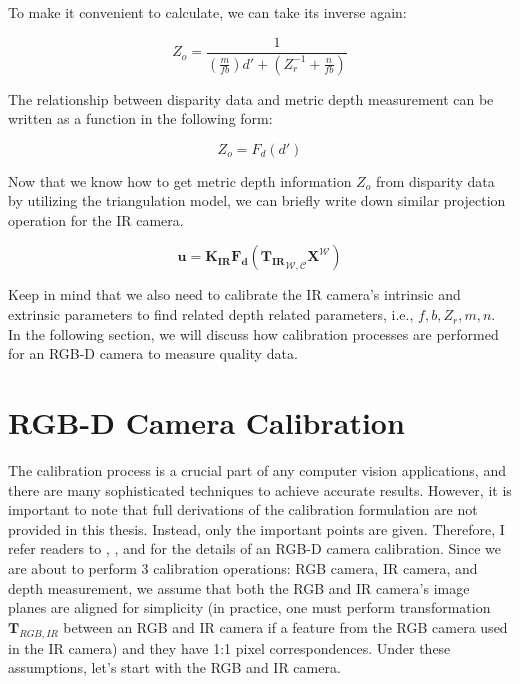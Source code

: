 \documentclass[12pt]{report}
\numberwithin{figure}{section}
\begin{document}
To make it convenient to calculate, we can take its inverse again:

\begin{equation}\label{eq:depth_w_disparity}
  Z_o = \frac{1}{(\frac{m}{fb})d' + (Z_r^{-1} + \frac{n}{fb})}
\end{equation}

The relationship between disparity data and metric depth measurement can be 
written as a function in the following form:

\begin{equation}\label{eq:ir_cam_proj_func}
  Z_o
  =
  F_d(d')
\end{equation} 


Now that we know how to get metric depth information $Z_o$ from 
disparity data 
by utilizing the triangulation model, we can briefly write down similar 
projection operation for the IR camera.

\begin{equation}\label{eq:ir_cam_proj_func}
  \mathbf{u} 
  =
  \mathbf{K_{IR}} \mathbf{F_d} ({\mathbf{T_{IR}}}_{\mathcal{W}, \mathcal{C}}  
  \mathbf{X^{\mathcal{W}}})
\end{equation} 


Keep in mind that we also need to calibrate the IR camera's intrinsic and 
extrinsic parameters to find related depth related parameters, i.e., 
$f,b,Z_r,m, n$. In the following section, we will discuss how calibration 
processes are performed for an RGB-D camera to measure quality data.

\section{RGB-D Camera Calibration} \label{sb_sc_rgb_calibration}

The calibration process is a crucial part of any computer vision applications, 
and there are many sophisticated techniques to achieve accurate results.  
However, 
it is important to note that full derivations of the calibration formulation 
are not provided in this thesis. Instead, only the important points are 
given.  
Therefore, I refer readers to \parencite{Zhang2000a}, \parencite{Smisek2011}, 
\parencite{Karan2015} and \parencite{Herrera2016a} for the details of an RGB-D 
camera 
calibration.  Since we are about to perform 3 calibration operations: RGB 
camera, IR camera, and depth measurement, we assume that both the RGB and IR 
camera's image planes are aligned for simplicity (in practice, one must 
  perform transformation $\mathbf{T}_{RGB,IR}$ between an RGB 
and IR camera if a feature from the RGB camera used in the IR camera) and they 
have 
1:1 pixel correspondences. Under these assumptions, let's start with the RGB 
and 
IR camera.
\end{document}
